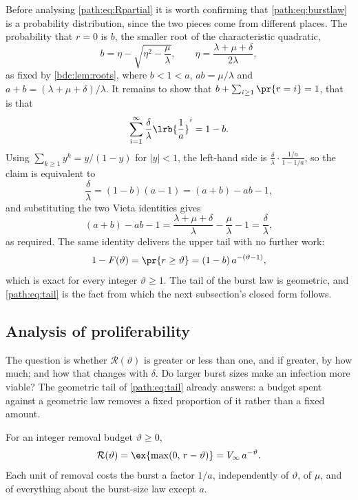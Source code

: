 Before analysing \cref{path:eq:Rpartial} it is worth confirming that
\cref{path:eq:burstlaw} is a probability distribution, since the two pieces
come from different places. The probability that $r=0$ is $b$, the smaller
root of the characteristic quadratic,
\begin{equation}
b=\eta-\sqrt{\eta^{2}-\frac{\mu}{\lambda}},
\qquad
\eta=\frac{\lambda+\mu+\delta}{2\lambda},
\label{path:eq:broot}
\end{equation}
as fixed by \cref{bdc:lem:roots}, where $b<1<a$, $ab=\mu/\lambda$ and
$a+b=(\lambda+\mu+\delta)/\lambda$. It remains to show that
$b+\sum_{i\ge1}\pr{r=i}=1$, that is that
\[
\sum_{i=1}^{\infty}\frac{\delta}{\lambda}\lrb{\frac1a}^{i}=1-b .
\]
Using $\sum_{k\ge1}y^{k}=y/(1-y)$ for $|y|<1$, the left-hand side is
$\frac{\delta}{\lambda}\cdot\frac{1/a}{1-1/a}$, so the claim is equivalent to
\[
\frac{\delta}{\lambda}=(1-b)(a-1)=(a+b)-ab-1,
\]
and substituting the two Vieta identities gives
\[
(a+b)-ab-1=\frac{\lambda+\mu+\delta}{\lambda}-\frac{\mu}{\lambda}-1
=\frac{\delta}{\lambda},
\]
as required. The same identity delivers the upper tail with no further work:
\begin{equation}
1-F(\vartheta)=\pr{r\ge\vartheta}=(1-b)\,a^{-(\vartheta-1)},
\label{path:eq:tail}
\end{equation}
which is exact for every integer $\vartheta\ge1$. The tail of the burst law
is geometric, and \cref{path:eq:tail} is the fact from which the next
subsection's closed form follows.

\subsection{Analysis of proliferability}
\label{path:sec:proliferability}

The question is whether $\mathcal{R}(\vartheta)$ is greater or less than
one, and if greater, by how much; and how that changes with $\delta$. Do
larger burst sizes make an infection more viable? The geometric tail of
\cref{path:eq:tail} already answers: a budget spent against a geometric
law removes a fixed proportion of it rather than a fixed amount.

\begin{proposition}
\label{path:prop:ratio}
For an integer removal budget $\vartheta\ge0$,
\begin{equation}
\mathcal{R}(\vartheta)=\ex{\max(0,\,r-\vartheta)}=V_\infty\,a^{-\vartheta}.
\label{path:eq:R0}
\end{equation}
Each unit of removal costs the burst a factor $1/a$, independently of
$\vartheta$, of $\mu$, and of everything about the burst-size law except
$a$.
\end{proposition}


